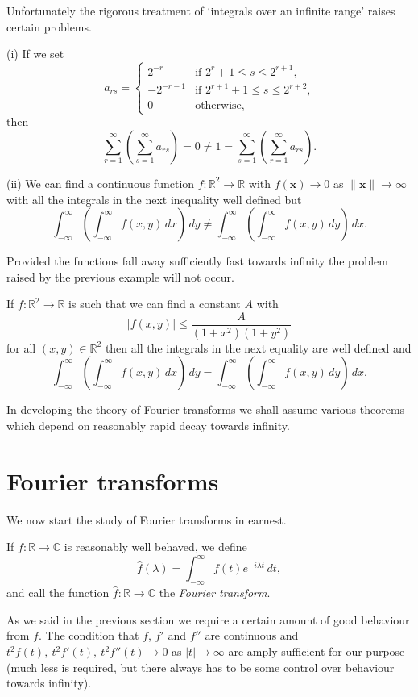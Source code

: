 Unfortunately the rigorous treatment of `integrals over
an infinite range' raises certain problems.
\begin{example} (i) If we set
\begin{equation*}
a_{rs}=\begin{cases}2^{-r}&\text{if $2^{r}+1\leq s\leq 2^{r+1}$,}\\
-2^{-r-1}&\text{if $2^{r+1}+1\leq s\leq 2^{r+2}$,}\\
0&\text{otherwise,}
\end{cases}
\end{equation*}
then
\[\sum_{r=1}^{\infty}\left(\sum_{s=1}^{\infty}a_{rs}\right)=0
\neq 1=\sum_{s=1}^{\infty}\left(\sum_{r=1}^{\infty}a_{rs}\right).\]

(ii) We can find a continuous function
$f:{\mathbb R}^{2}\rightarrow{\mathbb R}$ with
$f({\mathbf x})\rightarrow 0$ as $\|{\mathbf x}\|\rightarrow\infty$
with all the integrals in the next inequality well defined but
\[\int_{-\infty}^{\infty}\left(\int_{-\infty}^{\infty}f(x,y)\,dx\right)\,dy
\neq
\int_{-\infty}^{\infty}\left(\int_{-\infty}^{\infty}f(x,y)\,dy\right)\,dx.\]
\end{example}

Provided the functions fall away sufficiently fast towards infinity
the problem raised by the previous example will not occur.
\begin{lemma}  If
$f:{\mathbb R}^{2}\rightarrow{\mathbb R}$ is such that we can find
a constant $A$ with
\[|f(x,y)|\leq\frac{A}{(1+x^{2})(1+y^{2})}\]
for all $(x,y)\in{\mathbb R}^{2}$ then
all the integrals in the next equality are well defined and
\[\int_{-\infty}^{\infty}\left(\int_{-\infty}^{\infty}f(x,y)\,dx\right)\,dy
=
\int_{-\infty}^{\infty}\left(\int_{-\infty}^{\infty}f(x,y)\,dy\right)\,dx.\]
\end{lemma}

In developing the theory of Fourier transforms we shall
assume various theorems which depend on reasonably rapid decay towards
infinity.
\section{Fourier transforms} We now start the study
of Fourier transforms in earnest.

\begin{definition} If $f:{\mathbb R}\rightarrow{\mathbb C}$
is reasonably well behaved, we define
\[\hat{f}(\lambda)
=\int_{-\infty}^{\infty}f(t)e^{-i\lambda t}\,dt,\]
and call the function
$\hat{f}:{\mathbb R}\rightarrow{\mathbb C}$
the \emph{Fourier transform}.
\end{definition}
As we said in the previous section we require
a certain amount of good behaviour from $f$.
The condition that $f$, $f'$ and $f''$
are continuous and
$t^{2}f(t),\ t^{2}f'(t),\ t^{2}f''(t)\rightarrow 0$
as $|t|\rightarrow\infty$ are amply sufficient
for our purpose (much less is required,  but there
always has to be some control over behaviour towards
infinity).

